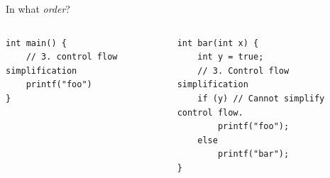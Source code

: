 \documentclass[8pt]{beamer}
\begin{document}
\begin{frame}[fragile]{In what \emph{order}?}


\pause
\begin{columns}
\begin{column}{.48\textwidth}
\begin{verbatim}
int main() {
    // 3. control flow simplification
    printf("foo")
}
\end{verbatim}
\end{column}
\begin{column}{.48\textwidth}
\begin{verbatim}
int bar(int x) {
    int y = true;
    // 3. Control flow simplification
    if (y) // Cannot simplify control flow. 
        printf("foo");
    else
        printf("bar");
}
\end{verbatim}
\end{column}
\end{columns}
\end{frame}
\end{document}
